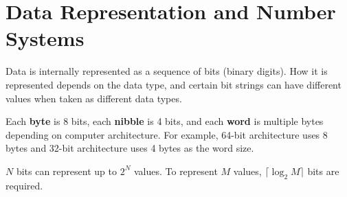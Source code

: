 \section{Data Representation and Number Systems}
Data is internally represented as a sequence of bits (binary digits). How it is
represented depends on the data type, and certain bit strings can have
different values when taken as different data types.
\begin{definition}
  Each \textbf{byte} is 8 bits, each \textbf{nibble} is 4 bits, and each
  \textbf{word} is multiple bytes depending on computer architecture. For
  example, 64-bit architecture uses 8 bytes and 32-bit architecture uses 4
  bytes as the word size.
\end{definition}
$N$ bits can represent up to $2^{N}$ values. To represent $M$ values,
$\lceil\log_2 M\rceil$ bits are required. 
